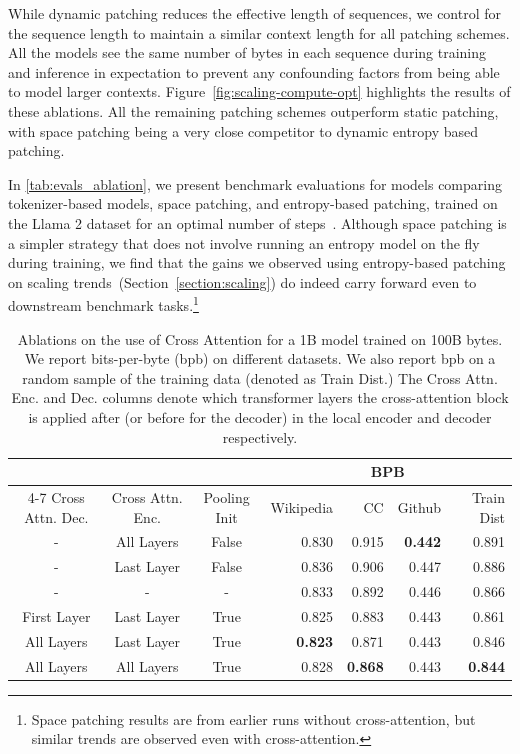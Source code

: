\documentclass[]{fairmeta}
\begin{document}
While dynamic patching reduces the effective length of sequences, we control for the sequence length to maintain a similar context length for all patching schemes. All the models see the same number of bytes in each sequence during training and inference in expectation to prevent any confounding factors from being able to model larger contexts. Figure~\ref{fig:scaling-compute-opt} highlights the results of these ablations. All the remaining patching schemes outperform static patching, with space patching being a very close competitor to dynamic entropy based patching. 

In \autoref{tab:evals_ablation}, we present benchmark evaluations for \model{} models comparing tokenizer-based models, space patching, and entropy-based patching, trained on the Llama 2 dataset for an optimal number of steps~\citep{dubey2024llama}. Although space patching is a simpler strategy that does not involve running an entropy model on the fly during training, we find that the gains we observed using entropy-based patching on scaling trends~(Section~\ref{section:scaling}) do indeed carry forward even to downstream benchmark tasks.\footnote{Space patching results are from earlier runs without cross-attention, but similar trends are observed even with cross-attention.} 

\begin{table}[t]
\centering
\begin{tabular}{@{}cccrrrr@{}}
\toprule
 &  & &  \multicolumn{4}{c}{BPB}  \\
 \cmidrule(lr){4-7} 
Cross Attn. Dec. & Cross Attn. Enc. & Pooling Init &  Wikipedia &    CC &  Github &  Train Dist \\
\midrule
               - &       All Layers &        False &      0.830 & 0.915 &   \textbf{0.442} &       0.891 \\
               - &       Last Layer &        False &      0.836 & 0.906 &   0.447 &       0.886 \\
               - &                - &            - &      0.833 & 0.892 &   0.446 &       0.866 \\
     First Layer &       Last Layer &         True &      0.825 & 0.883 &   0.443 &       0.861 \\
      All Layers &       Last Layer &         True &      \textbf{0.823} & 0.871 &   0.443 &       0.846 \\
      All Layers &       All Layers &         True &      0.828 & \textbf{0.868} &   0.443 &       \textbf{0.844} \\
\bottomrule
\end{tabular}
\caption{Ablations on the use of Cross Attention for a 1B \model{} model trained on 100B bytes. We report bits-per-byte (bpb) on different datasets. We also report bpb on a random sample of the training data (denoted as Train Dist.) The Cross Attn. Enc. and Dec. columns denote which transformer layers the cross-attention block is applied after (or before for the decoder) in the local encoder and decoder respectively.
}
\label{tab:crossattn_ablations_1b}
\end{table}
\end{document}
